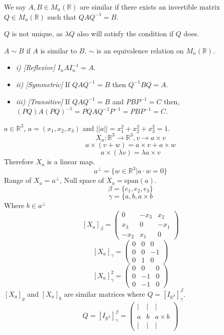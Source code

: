\documentclass[11pt,a4paper]{colorart}
\def\l{\left}
\def\r{\right}
\def\R{\mathbb{R}}
\def\a{\alpha}
\def\b{\beta}
\def\g{\gamma}
\begin{document}
\begin{definition}
	We say $A,B\in M_n\l(\R\r)$ are similar if there exists an invertible matrix $Q\in M_n\l(\R\r)$ such that $QAQ^{-1}=B$.
\end{definition}

$Q$ is not unique, as $\lambda Q$ also will satisfy the condition if $Q$ does.

\begin{remark}
	$A\sim B$ if $A$ is similar to $B$. $\sim$ is an equivalence relation on $M_n\l(\R\r)$.
	\begin{itemize} 
		\item \textit{i) [Reflexive]} $I_nAI_n^{-1} = A$.
		\item \textit{ii) [Symmetric]} If $QAQ^{-1} = B$ then $Q^{-1}BQ = A$.
		\item \textit{iii) [Transitive]} If $QAQ^{-1} = B$ and $PBP^{-1}=C$ then, $\l(PQ\r)A\l(PQ\r)^{-1} = PQAQ^{-1}P^{-1}=PBP^{-1}=C$.
	\end{itemize}
			
\end{remark}

\begin{example}
	$a\in \R^3$, $a=\l(x_1,x_2,x_3\r)$ and $||a|| = x_1^2 + x_2^2 + x_3^2 = 1$.
	\[ X_a: \R^3\rightarrow \R^3, v \rightarrow a \times v \]
	\[ a\times \l(v + w\r) = a \times v + a \times w \]
	\[ a \times \l(\lambda v\r) = \lambda a \times v \]
	Therefore $X_a$ is a linear map.
	\[ a^\perp = \{ w \in \R^3 | a\cdot w = 0\} \]
	Range of $X_a = a^\perp$, Null space of $X_a = $span$\l(a\r)$. 
	\[ \b = \{ e_1,e_2,e_3\} \]
	\[ \g = \{a,b,a\times b \]
	Where $b\in a^\perp$
	\[ \l[ X_a \r]_\b = \begin{pmatrix} 0&-x_3&x_2\\x_3&0&-x_1\\-x_2&x_1&0\end{pmatrix} \]
	\[ \l[ X_a \r]_\g = \begin{pmatrix} 0&0&0\\0&0&-1\\0&1&0\end{pmatrix} \]
	\[ \l[ X_a \r]_\g^2 = \begin{pmatrix} 0&0&0\\0&-1&0\\0&-1&0\end{pmatrix} \]
	$\l[ X_a \r]_g$ and $\l[ X_a \r]_b$ are similar matrices where $Q= \l[ I_{\R^3} \r]^\b_\g$.
	\[ Q= \l[ I_{\R^3} \r]^\b_\g = \begin{pmatrix} |&|&|\\a&b&a\times b\\|&|&| \end{pmatrix} \]

\end{example}
\end{document}
